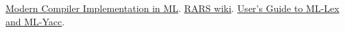\documentclass{CSEThesis}
\begin{document}






\tableofcontents 



\def\headrulehook{\color{black}}      %

\typeout{}

\cleardoublepage 
\typeout{}

\cleardoublepage 
\typeout{}

\cleardoublepage 
\typeout{}

\cleardoublepage 
\typeout{}

\cleardoublepage 
\typeout{}

% 
% 
\begin{thebibliography}{9}
  \href{https://www.cs.princeton.edu/~appel/modern/ml/}{Modern Compiler Implementation in ML}.   
  \href{https://github.com/TheThirdOne/rars/wiki}{RARS wiki}.   
  \href{http://www.cs.tufts.edu/comp/181/ug.pdf}{User's Guide to ML-Lex and ML-Yacc}.
  \end{thebibliography}
\end{document}
